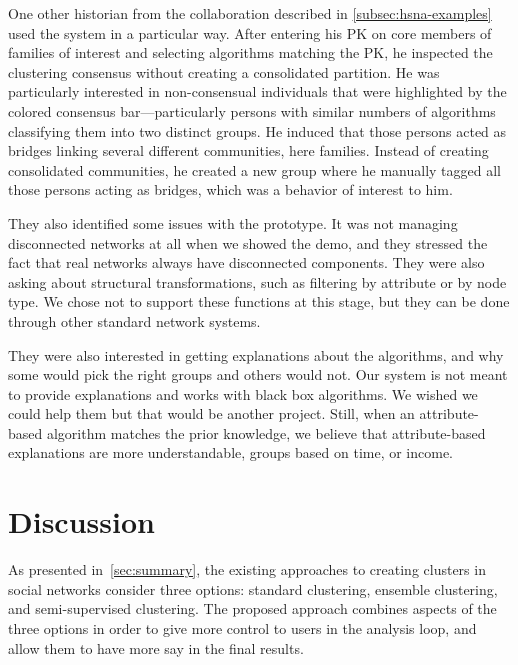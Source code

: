 One other historian from the collaboration \pascal described in \autoref{subsec:hsna-examples} used the system in a particular way. After entering his PK on core members of families of interest and selecting algorithms matching the PK, he inspected the clustering consensus without creating a consolidated partition. He was particularly interested in non-consensual individuals that were highlighted by the colored consensus bar---particularly persons with similar numbers of algorithms classifying them into two distinct groups.
He induced that those persons acted as bridges linking several different communities, here families.
Instead of creating consolidated communities, he created a new group where he manually tagged all those persons acting as bridges, which was a behavior of interest to him.

They also identified some issues with the prototype. It was not managing disconnected networks at all when we showed the demo, and they stressed the fact that real networks always have disconnected components. They were also asking about structural transformations, such as filtering by attribute or by node type. We chose not to support these functions at this stage, but they can be done through other standard network systems.

They were also interested in getting explanations about the algorithms, and why some would pick the right groups and others would not. Our system is not meant to provide explanations and works with black box algorithms. We wished we could help them but that would be another project. Still, when an attribute-based algorithm matches the prior knowledge, we believe that attribute-based explanations are more understandable, \eg groups based on time, or income.



\section{Discussion}

As presented in~\autoref{sec:summary}, the existing approaches to creating clusters in social networks consider three options: standard clustering, ensemble clustering, and semi-supervised clustering.
The proposed \pkclustering approach combines aspects of the three options in order to give more control to users in the analysis loop, and allow them to have more say in the final results.

